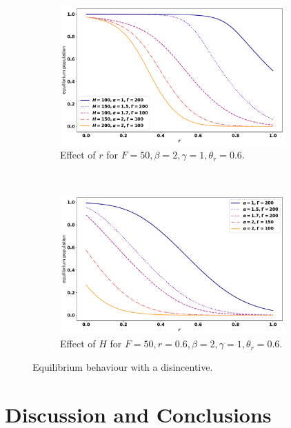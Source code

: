 \documentclass[10pt]{article}
\begin{document}
\begin{figure}[!htbp]
\centering
    \begin{subfigure}{.5\textwidth}
        \centering
        \includegraphics[width=0.95\textwidth]{images/new-utility-over_r.pdf}
        \caption{Effect of \(r\) for \(F=50, \beta=2, \gamma=1, \theta_r=0.6\).}
        \label{fig:equilibrium-over-r-tilde-u}
    \end{subfigure}
    ~
    \begin{subfigure}{.5\textwidth}
        \centering
        \includegraphics[width=0.95\textwidth]{images/new-utility-over_H.pdf}
        \caption{Effect of \(H\) for \(F=50, r=0.6, \beta=2, \gamma=1, \theta_r=0.6\).}
        \label{fig:equilibrium-over-H-tilde-u}
    \end{subfigure}
    \caption{Equilibrium behaviour with a disincentive.}
\end{figure}

\section{Discussion and Conclusions}
\label{section:discussion}
\end{document}
